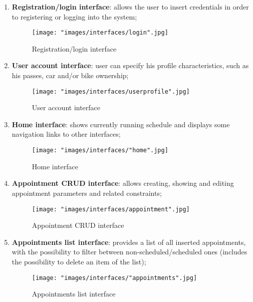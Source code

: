 \begin{enumerate}
\item \textbf{Registration/login interface}: allows the user to insert credentials in order to registering or logging into the system;
\begin{figure}[H]
\begin{center}
\texttt{[image: "images/interfaces/login".jpg]}
\caption{Registration/login interface}
\end{center}
\end{figure}

\item \textbf{User account interface}: user can specify his profile characteristics, such as his passes, car and/or bike ownership;
\begin{figure}[H]
\begin{center}
\texttt{[image: "images/interfaces/userprofile".jpg]}
\caption{User account interface}
\end{center}
\end{figure}

\item \textbf{Home interface}: shows currently running schedule and displays some navigation links to other interfaces;
\begin{figure}[H]
\begin{center}
\texttt{[image: "images/interfaces/"home".jpg]}
\caption{Home interface}
\end{center}
\end{figure}

\item \textbf{Appointment CRUD interface}: allows creating, showing and editing appointment parameters and related constraints;
\begin{figure}[H]
\begin{center}
\texttt{[image: "images/interfaces/appointment".jpg]}
\caption{Appointment CRUD interface}
\end{center}
\end{figure}

\item \textbf{Appointments list interface}: provides a list of all inserted appointments, with the possibility to filter between non-scheduled/scheduled ones (includes the possibility to delete an item of the list);
\begin{figure}[H]
\begin{center}
\texttt{[image: "images/interfaces/"appointments".jpg]}
\caption{Appointments list interface}
\end{center}
\end{figure}


\end{enumerate}
